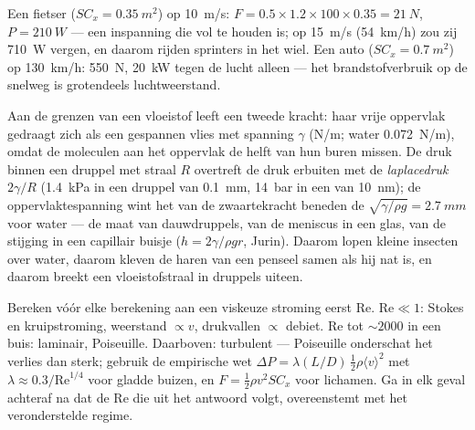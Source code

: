 \begin{example}\label{ex:b2:viscous-flows:cyclist}
Een fietser ($SC_x = \qty{0.35}{m^2}$) op \qty{10}{m/s}:
$F = 0.5 \times 1.2 \times 100
\times 0.35 = \qty{21}{N}$,
$P = \qty{210}{W}$ --- een inspanning die vol te houden is; op \qty{15}{m/s}
(\qty{54}{km/h}) zou zij \qty{710}{W} vergen, en daarom rijden sprinters in
het wiel. Een auto ($SC_x = \qty{0.7}{m^2}$) op \qty{130}{km/h}:
\qty{550}{N}, \qty{20}{kW} tegen de lucht alleen --- het brandstofverbruik
op de snelweg is grotendeels luchtweerstand.
\end{example}

\begin{remark}[Oppervlaktespanning]\label{rem:b2:viscous-flows:capillarity}
Aan de grenzen van een vloeistof leeft een tweede kracht: haar vrije
oppervlak gedraagt zich als een gespannen vlies met spanning $\gamma$
(\unit{N/m}; water \qty{0.072}{N/m}), omdat de moleculen aan het oppervlak
de helft van hun buren missen. De druk binnen een druppel met straal $R$
overtreft de druk erbuiten met de \emph{laplacedruk} $2\gamma/R$
(\qty{1.4}{kPa} in een druppel van \qty{0.1}{mm}, \qty{14}{bar} in een van
\qty{10}{nm}); de oppervlaktespanning wint het van de zwaartekracht beneden
de \emph{} $\sqrt{\gamma/\rho g} = \qty{2.7}{mm}$ voor
water --- de maat van dauwdruppels, van de meniscus in een glas, van de
stijging in een capillair buisje ($h = 2\gamma/\rho gr$, Jurin). Daarom
lopen kleine insecten over water, daarom kleven de haren van een penseel
samen als hij nat is, en daarom breekt een vloeistofstraal in druppels
uiteen.
\end{remark}

\begin{method}\label{met:b2:viscous-flows:regime}
Bereken vóór elke berekening aan een viskeuze stroming eerst $\mathrm{Re}$.
$\mathrm{Re} \ll 1$: Stokes en kruipstroming, weerstand $\propto v$,
drukvallen $\propto$ debiet. $\mathrm{Re}$ tot $\sim\!2000$ in een buis:
laminair, Poiseuille. Daarboven: turbulent --- Poiseuille onderschat het
verlies dan sterk; gebruik de empirische wet
$\Delta P = \lambda(L/D)\,\tfrac12\rho\langle v\rangle^2$ met
$\lambda
\approx 0.3/\mathrm{Re}^{1/4}$ voor gladde buizen, en
$F = \tfrac12\rho v^2SC_x$ voor lichamen. Ga in elk geval achteraf na dat de
$\mathrm{Re}$ die uit het antwoord volgt, overeenstemt met het
veronderstelde regime.
\end{method}

